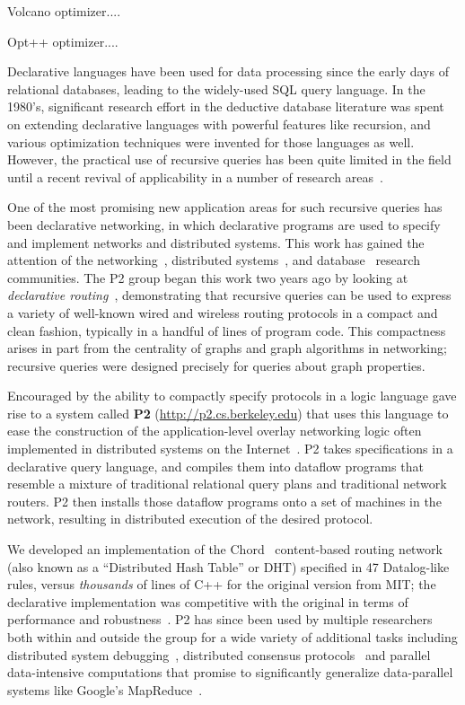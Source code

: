 \documentclass{vldb}
\begin{document}
Volcano optimizer....

Opt++ optimizer....

\label{sec:declarativenets}
Declarative languages have been used for data processing since the
early days of relational databases, leading to the widely-used SQL
query language.  In the 1980's, significant research effort in the
deductive database literature was spent on extending declarative
languages with powerful features like recursion, and various
optimization techniques were invented for those languages as well.
However, the practical use of recursive queries has been quite limited
in the field until a recent revival of applicability in a number of
research areas~\cite{ullmantalk}.

One of the most promising new application areas for such recursive
queries has been declarative networking, in which declarative programs
are used to specify and implement networks and distributed systems.
This work has gained the attention of the
networking~\cite{loo-sigcomm05,condie-hotnets05}, distributed
systems~\cite{loo-sosp05,singh-eurosys06}, and
database~\cite{loo-sigmod06} research communities.  The P2
group began this work two years ago by looking at {\em declarative
  routing}~\cite{loo-sigcomm05}, demonstrating that recursive queries
can be used to express a variety of well-known wired and wireless
routing protocols in a compact and clean fashion, typically in a
handful of lines of program code.  This compactness arises in part
from the centrality of graphs and graph algorithms in networking;
recursive queries were designed precisely for queries about graph
properties.  

Encouraged by the ability to compactly specify protocols in a logic
language gave rise to a system called {\bf P2}
(\url{http://p2.cs.berkeley.edu}) that uses this language to ease the
construction of the application-level overlay networking logic often
implemented in distributed systems on the Internet~\cite{loo-sosp05}.
P2 takes specifications in a declarative query language, and compiles
them into dataflow programs that resemble a mixture of traditional
relational query plans and traditional network routers.  P2 then
installs those dataflow programs onto a set of machines in the
network, resulting in distributed execution of the desired protocol.

We developed an implementation of the Chord~\cite{chord}
content-based routing network (also known as a ``Distributed Hash
Table'' or DHT) specified in 47 Datalog-like rules, versus {\em
  thousands} of lines of C++ for the original version from MIT; the
declarative implementation was competitive with the original in terms
of performance and robustness~\cite{loo-sosp05}.  P2 has since been
used by multiple researchers both within and outside the group for a
wide variety of additional tasks including distributed system
debugging~\cite{singh-eurosys06}, distributed consensus
protocols~\cite{paxon} and parallel data-intensive computations that
promise to significantly generalize data-parallel systems like
Google's MapReduce~\cite{mapreduce}.  
\end{document}
